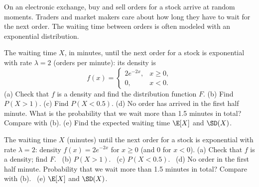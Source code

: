 
\begin{problem}
	\begin{context}
		On an electronic exchange, buy and sell orders for a stock arrive at
		random moments. Traders and market makers care about how long they have
		to wait for the next order. The waiting time between orders is often
		modeled with an exponential distribution.
	\end{context}
	The waiting time $X$, in minutes, until the next order for a stock is
	exponential with rate $\lambda=2$ (orders per minute): its density is
	\[ f(x)=\begin{cases} 2e^{-2x}, & x\ge0,\\ 0, & x<0. \end{cases} \]
	(a) Check that $f$ is a density and find the distribution function $F$.
	(b) Find $P(X>1)$.
	(c) Find $P(X<0.5)$.
	(d) No order has arrived in the first half minute. What is the
	probability that we wait more than 1.5 minutes in total? Compare with (b).
	(e) Find the expected waiting time $\E[X]$ and $\SD(X)$.
\end{problem}

\begin{slideproblem}
	The waiting time $X$ (minutes) until the next order for a stock is
	exponential with rate $\lambda=2$: density $f(x)=2e^{-2x}$ for $x\ge0$
	(and $0$ for $x<0$).
	(a) Check that $f$ is a density; find $F$.
	\ (b) $P(X>1)$.
	\ (c) $P(X<0.5)$.
	\ (d) No order in the first half minute. Probability that we wait more
	than 1.5 minutes in total? Compare with (b).
	\ (e) $\E[X]$ and $\SD(X)$.
\end{slideproblem}

